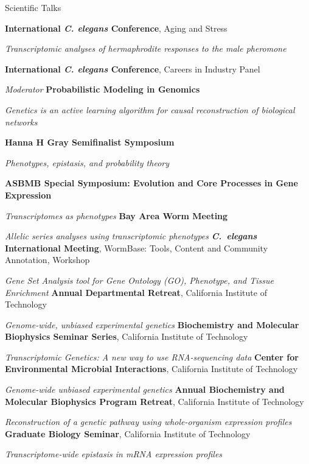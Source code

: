 \begin{rubric}{Scientific Talks}

\entry*[2021]
  \textbf{ International \emph{C. elegans} Conference}, Aging and Stress\par
    \emph{Transcriptomic analyses of hermaphrodite responses to the male pheromone}

  \textbf{ International \emph{C. elegans} Conference}, Careers in Industry Panel\par
    \emph{Moderator}
\entry*[2019]
  \textbf{Probabilistic Modeling in Genomics}\par
    \emph{Genetics is an active learning algorithm for causal reconstruction of
          biological networks}\par
  \textbf{Hanna H Gray Semifinalist Symposium}\par
  \emph{Phenotypes, epistasis, and probability theory}

  \textbf{ASBMB Special Symposium: Evolution and Core Processes in
          Gene Expression}\par
  \emph{Transcriptomes as phenotypes}
\entry*[2018]
  \textbf{Bay Area Worm Meeting}\par
  \emph{Allelic series analyses using transcriptomic phenotypes}
\entry*[2017]
  \textbf{ \emph{C.~elegans} International Meeting}, WormBase: Tools,
  Content and Community Annotation, Workshop\par
  \emph{Gene Set Analysis tool for Gene Ontology (GO), Phenotype, and Tissue
  Enrichment}
\entry*[2017]
  \textbf{Annual Departmental Retreat}, California Institute of Technology\par
  \emph{Genome-wide, unbiased experimental genetics}
\entry*[2017]
  \textbf{Biochemistry and Molecular Biophysics Seminar Series}, California
  Institute of Technology\par
  \emph{Transcriptomic Genetics: A new way to use RNA-sequencing data}
\entry*[2017]
  \textbf{Center for Environmental Microbial Interactions}, California Institute
  of Technology\par
  \emph{Genome-wide unbiased experimental genetics}
\entry*[2016]
  \textbf{Annual Biochemistry and Molecular Biophysics Program Retreat},
  California Institute of Technology\par
  \emph{Reconstruction of a genetic pathway using whole-organism expression
  profiles}
\entry*[2016]
  \textbf{Graduate Biology Seminar}, California Institute of Technology\par
  \emph{Transcriptome-wide epistasis in mRNA expression profiles}

\end{rubric}
